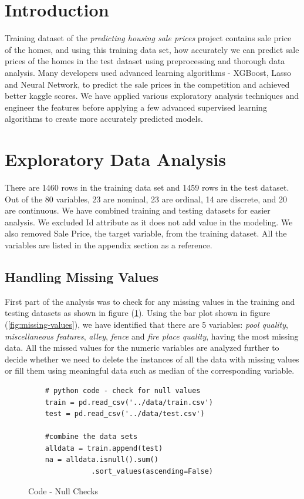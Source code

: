 \documentclass[sigconf]{acmart}
\begin{document}
	
	\section{Introduction} 
	
	Training dataset of the {\em predicting housing sale prices} project contains sale price of the homes, and using this training data set, how accurately we can predict sale prices  of the homes in the test dataset using preprocessing and thorough data analysis. Many developers used advanced learning algorithms - XGBoost, Lasso and Neural Network, to predict the sale prices in the competition and achieved better kaggle scores. We have applied various exploratory analysis techniques and engineer the features before applying a few advanced supervised learning algorithms to create more accurately predicted models. 
	
		
	\section{Exploratory Data Analysis} 
		
	There are 1460 rows in the training data set and 1459 rows in the test dataset. Out of the 80 variables, 23 are nominal, 23 are ordinal, 14 are discrete, and 20 are continuous. We have combined training and testing datasets for easier analysis. We excluded Id attribute as it does not add value in the modeling. We also removed Sale Price, the target variable, from the training dataset. All the variables are listed in the appendix section as a reference.
	
	\subsection{Handling Missing Values}
	
	First part of the analysis was to check for any missing values in the training and testing datasets as shown in figure (\ref{c:check-nulls}). Using the bar plot shown in figure (\ref{fig:missing-values}), we have identified that there are 5 variables: {\em pool quality}, {\em miscellaneous features}, {\em alley}, {\em fence} and {\em fire place quality}, having the most missing data. All the missed values for the numeric variables are analyzed further to decide whether we need to delete the instances of all the data with missing values or fill them using meaningful data such as median of the corresponding variable. 
	
	\begin{figure}[htb]
	\begin{verbatim}		
	# python code - check for null values
	train = pd.read_csv('../data/train.csv')
	test = pd.read_csv('../data/test.csv')
		
	#combine the data sets
	alldata = train.append(test)	
	na = alldata.isnull().sum()
	           .sort_values(ascending=False)
	\end{verbatim}
	\caption{Code - Null Checks}\label{c:check-nulls}
	\end{figure}
	
\end{document}
